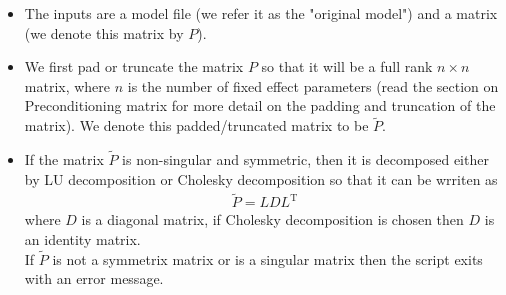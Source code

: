 \begin{itemize}
    \item The inputs are a model file (we refer it as the "original model") and a matrix (we denote this matrix by $P$).
    \item We first pad or truncate the matrix $P$ so that it will be a full rank $n \times n$ matrix, where $n$ is the number of fixed effect parameters (read the section on Preconditioning matrix for more detail on the padding and truncation of the matrix).  We denote this padded/truncated matrix to be $\tilde{P}$.
    \item If the matrix $\tilde{P}$ is non-singular and symmetric, then it is decomposed either by LU decomposition or Cholesky decomposition so that it can be wrriten as 
    \begin{eqnarray*}
    \tilde{P}=LDL^\textrm{T}
    \end{eqnarray*}
    where $D$ is a diagonal matrix, if Cholesky decomposition is chosen then $D$ is an identity matrix.\\
    If $\tilde{P}$ is not a symmetrix matrix or is a singular matrix then the script exits with an error message.


\end{itemize}
